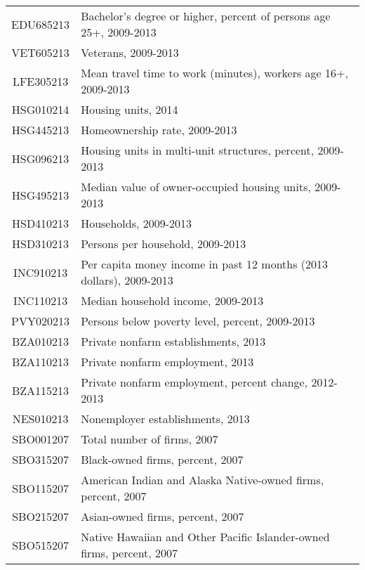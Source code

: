 \begin{tabularx}{\linewidth}[H]{@{}cX@{}}
	EDU685213 & Bachelor's degree or higher, percent of persons age 25+, 2009-2013     \\
	VET605213 & Veterans, 2009-2013                                                    \\
	LFE305213 & Mean travel time to work (minutes), workers age 16+, 2009-2013         \\
	HSG010214 & Housing units, 2014                                                    \\
	HSG445213 & Homeownership rate, 2009-2013                                          \\
	HSG096213 & Housing units in multi-unit structures, percent, 2009-2013             \\
	HSG495213 & Median value of owner-occupied housing units, 2009-2013                \\
	HSD410213 & Households, 2009-2013                                                  \\
	HSD310213 & Persons per household, 2009-2013                                       \\
	INC910213 & Per capita money income in past 12 months (2013 dollars), 2009-2013    \\
	INC110213 & Median household income, 2009-2013                                     \\
	PVY020213 & Persons below poverty level, percent, 2009-2013                        \\
	BZA010213 & Private nonfarm establishments, 2013                                   \\
	BZA110213 & Private nonfarm employment,  2013                                      \\
	BZA115213 & Private nonfarm employment, percent change, 2012-2013                  \\
	NES010213 & Nonemployer establishments, 2013                                       \\
	SBO001207 & Total number of firms, 2007                                            \\
	SBO315207 & Black-owned firms, percent, 2007                                       \\
	SBO115207 & American Indian and Alaska Native-owned firms, percent, 2007          \\
	SBO215207 & Asian-owned firms, percent, 2007                                       \\
	SBO515207 & Native Hawaiian and Other Pacific Islander-owned firms, percent, 2007 \\

\end{tabularx}
